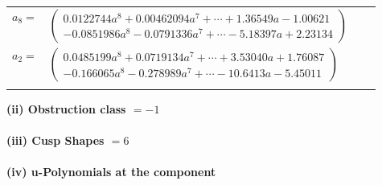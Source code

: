 \documentclass[1p]{elsarticle_modified}
\theoremstyle{definition}
\begin{document}
\begin{tabular}{m{7pt} m{180pt} m{7pt} m{180pt} }
\flushright $a_{8}=$&$\begin{pmatrix}0.0122744 a^{8}+0.00462094 a^{7}+\cdots+1.36549 a-1.00621\\-0.0851986 a^{8}-0.0791336 a^{7}+\cdots-5.18397 a+2.23134\end{pmatrix}$ \\
\flushright $a_{2}=$&$\begin{pmatrix}0.0485199 a^{8}+0.0719134 a^{7}+\cdots+3.53040 a+1.76087\\-0.166065 a^{8}-0.278989 a^{7}+\cdots-10.6413 a-5.45011\end{pmatrix}$\\&\end{tabular}
\flushleft \textbf{(ii) Obstruction class $= -1$}\\~\\
\flushleft \textbf{(iii) Cusp Shapes $= 6$}\\~\\
\newpage\renewcommand{\arraystretch}{1}
\flushleft \textbf{(iv) u-Polynomials at the component}\newline \\
\end{document}
